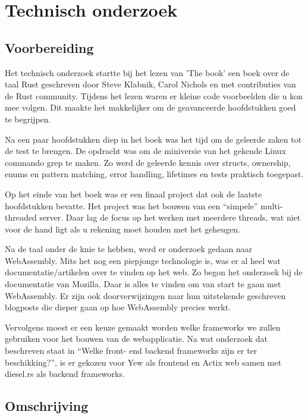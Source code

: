 \chapter{Technisch onderzoek}

\section{Voorbereiding}

Het technisch onderzoek startte bij het lezen van 'The book' een boek over de taal Rust geschreven
door Steve Klabnik, Carol Nichols en met contributies van de Rust community. Tijdens het lezen waren
er kleine code voorbeelden die u kon mee volgen. Dit maakte het makkelijker om de geavanceerde
hoofdstukken goed te begrijpen. 

Na een paar hoofdstukken diep in het boek was het tijd om de geleerde zaken tot de test te brengen.
De opdracht was om de miniversie van het gekende Linux commando grep te maken. Zo werd de geleerde
kennis over structs, ownership, enums en pattern matching, error handling, lifetimes en tests
praktisch toegepast.  

Op het einde van het boek was er een finaal project dat ook de laatste hoofdstukken bevatte. Het
project was het bouwen van een “simpele” multi-threaded server. Daar lag de focus op het werken met
meerdere threads, wat niet voor de hand ligt als u rekening moet houden met het geheugen. 

Na de taal onder de knie te hebben, werd er onderzoek gedaan naar WebAssembly. Mits het nog een
piepjonge technologie is, was er al heel wat documentatie/artikelen over te vinden op het web. Zo
begon het onderzoek bij de documentatie van Mozilla. Daar is alles te vinden om van start te gaan
met WebAssembly. Er zijn ook doorverwijzingen naar hun uitstekende geschreven blogposts die dieper
gaan op hoe WebAssembly precies werkt.

Vervolgens moest er een keuze gemaakt worden welke frameworks we zullen gebruiken voor het bouwen
van de webapplicatie. Na wat onderzoek dat beschreven staat in “Welke front- end backend frameworks
zijn er ter beschikking?”, is er gekozen voor Yew als frontend en Actix web samen met diesel.rs als
backend frameworks.

\clearpage

\section{Omschrijving}

